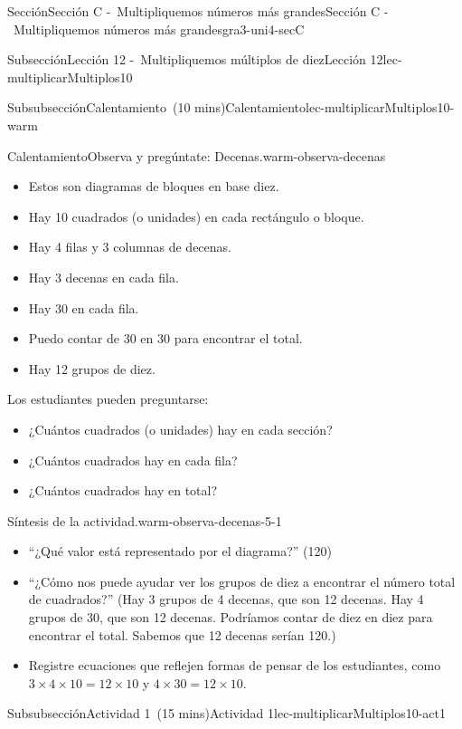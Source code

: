 \documentclass[oneside,10pt,]{article}
\begin{document}
\begin{sectionptx}{Sección}{Sección C -~Multipliquemos números más grandes}{}{Sección C -~Multipliquemos números más grandes}{}{}{gra3-uni4-secC}
\begin{subsectionptx}{Subsección}{Lección 12 -~Multipliquemos múltiplos de diez}{}{Lección 12}{}{}{lec-multiplicarMultiplos10}
\begin{subsubsectionptx}{Subsubsección}{Calentamiento~(10 mins)}{}{Calentamiento}{}{}{lec-multiplicarMultiplos10-warm}
\begin{exploration}{Calentamiento}{Observa y pregúntate: Decenas.}{warm-observa-decenas}
%
\begin{itemize}[label=\textbullet]
\item{}Estos son diagramas de bloques en base diez.%
\item{}Hay 10 cuadrados (o unidades) en cada rectángulo o bloque.%
\item{}Hay 4 filas y 3 columnas de decenas.%
\item{}Hay 3 decenas en cada fila.%
\item{}Hay 30 en cada fila.%
\item{}Puedo contar de 30 en 30 para encontrar el total.%
\item{}Hay 12 grupos de diez.%
\end{itemize}
Los estudiantes pueden preguntarse:%
%
\begin{itemize}[label=\textbullet]
\item{}¿Cuántos cuadrados (o unidades) hay en cada sección?%
\item{}¿Cuántos cuadrados hay en cada fila?%
\item{}¿Cuántos cuadrados hay en total?%
\end{itemize}
\end{exploration}%
\par
\begin{paragraphs}{Síntesis de la actividad.}{warm-observa-decenas-5-1}%
%
\begin{itemize}[label=\textbullet]
\item{}``¿Qué valor está representado por el diagrama?'' (120)%
\item{}``¿Cómo nos puede ayudar ver los grupos de diez a encontrar el número total de cuadrados?'' (Hay 3 grupos de 4 decenas, que son 12 decenas. Hay 4 grupos de 30, que son 12 decenas. Podríamos contar de diez en diez para encontrar el total. Sabemos que 12 decenas serían 120.)%
\item{}Registre ecuaciones que reflejen formas de pensar de los estudiantes, como \(3 \times 4 \times 10 = 12 \times 10\) y \(4 \times 30 = 12 \times 10\).%
\end{itemize}
\end{paragraphs}%
\end{subsubsectionptx}
%
%
\typeout{************************************************}
\typeout{************************************************}
%
\begin{subsubsectionptx}{Subsubsección}{Actividad 1~(15 mins)}{}{Actividad 1}{}{}{lec-multiplicarMultiplos10-act1}
\par

\end{subsubsectionptx}
\end{subsectionptx}
\end{sectionptx}
\end{document}
